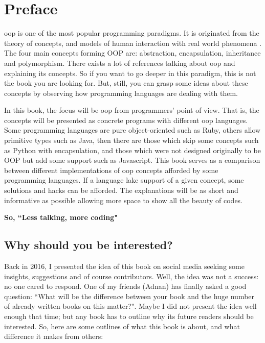 \documentclass[12pt]{book}
\begin{document}
\fi

\chapter*{Preface}

{
\merienda

\ac{oop} is one of the most popular programming paradigms. 
It is originated from the theory of concepts, and models of human interaction with real world phenomena \citep{2013-normark}.
The four main concepts forming OOP are: abstraction, encapsulation, inheritance and polymorphism.
There exists a lot of references talking about \ac{oop} and explaining its concepts.
So if you want to go deeper in this paradigm, this is not the book you are looking for. 
But, still, you can grasp some ideas about these concepts by observing how programming languages are dealing with them.


In this book, the focus will be \ac{oop} from programmers' point of view.
That is, the concepts will be presented as concrete programs with different \ac{oop} languages. 
Some programming languages are pure object-oriented such as Ruby, others allow primitive types such as Java, then there are those which skip some concepts such as Python with encapsulation, and those which were not designed originally to be OOP but add some support such as Javascript.
This book serves as a comparison between different implementations of \ac{oop} concepts afforded by some programming languages.
If a language lake support of a given concept, some solutions and hacks can be afforded. 
The explanations will be as short and informative as possible allowing more space to show all the beauty of codes.

}
\vfill
\begin{flushright}
	\LARGE\bfseries
So, ``Less talking, more coding"
\end{flushright}

\newpage

\section*{Why should you be interested?}

Back in 2016, I presented the idea of this book on social media seeking some insights, suggestions and of course contributors.
Well, the idea was not a success: no one cared to respond. 
One of my friends (Adnan) has finally asked a good question: ``What will be the difference between your book and the huge number of already written books on this matter?".
Maybe I did not present the idea well enough that time; but any book has to outline why its future readers should be interested. 
So, here are some outlines of what this book is about, and what difference it makes from others:
\end{document}
